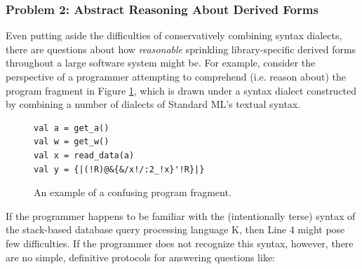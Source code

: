 \subsubsection{Problem 2: Abstract Reasoning About Derived Forms}\label{sec:abs-reasoning-intro}
Even putting aside the difficulties of conservatively combining syntax dialects, there are questions about how \emph{reasonable}  sprinkling library-specific derived forms throughout a large software system might be. 
For example, consider the perspective of a programmer attempting to comprehend (i.e. reason about) the program fragment in Figure \ref{fig:K-dialect}, which is drawn under a syntax dialect constructed by combining a number of dialects of Standard ML's textual syntax.

\begin{figure}[h]
\begin{lstlisting}
val a = get_a()
val w = get_w()
val x = read_data(a)
val y = {|(!R)@&{&/x!/:2_!x}'!R}|}
\end{lstlisting}
\caption{An example of a confusing program fragment.}
\label{fig:K-dialect}
\end{figure}

If the programmer happens to be familiar with the (intentionally terse) syntax of the stack-based database query processing language K, then Line 4 might pose few difficulties. If the programmer does not recognize this syntax, however, there are no simple, definitive protocols for answering questions like:

